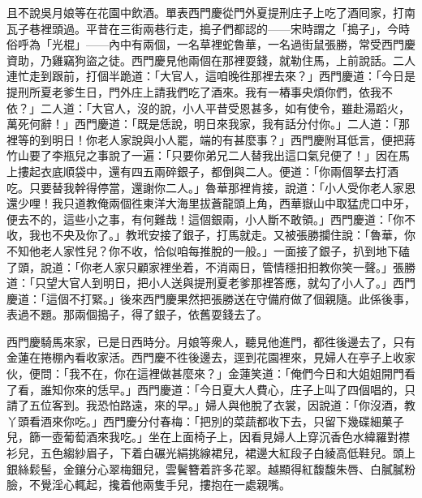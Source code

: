 且不說吳月娘等在花園中飲酒。單表西門慶從門外夏提刑庄子上吃了酒囘家，打南瓦子巷裡頭過。平昔在三街兩巷行走，搗子們都認的——宋時謂之「搗子」，今時俗呼為「光棍」——內中有兩個，一名草裡蛇魯華，一名過街鼠張勝，常受西門慶資助，乃雞竊狗盜之徒。西門慶見他兩個在那裡耍錢，就勒住馬，上前說話。二人連忙走到跟前，打個半跪道：「大官人，這咱晚徃那裡去來？」西門慶道：「今日是提刑所夏老爹生日，門外庄上請我們吃了酒來。我有一樁事央煩你們，依我不依？」二人道：「大官人，沒的說，小人平昔受恩甚多，如有使令，雖赴湯蹈火，萬死何辭！」西門慶道：「既是恁說，明日來我家，我有話分付你。」二人道：「那裡等的到明日！你老人家說與小人罷，端的有甚麼事？」西門慶附耳低言，便把蔣竹山要了李瓶兒之事說了一遍：「只要你弟兄二人替我出這口氣兒便了！」因在馬上摟起衣底順袋中，還有四五兩碎銀子，都倒與二人。便道：「你兩個拏去打酒吃。只要替我幹得停當，還謝你二人。」魯華那裡肯接，說道：「小人受你老人家恩還少哩！我只道教俺兩個徃東洋大海里拔蒼龍頭上角，西華嶽山中取猛虎口中牙，便去不的，這些小之事，有何難哉！這個銀兩，小人斷不敢領。」西門慶道：「你不收，我也不央及你了。」教玳安接了銀子，打馬就走。又被張勝攔住說：「魯華，你不知他老人家性兒？你不收，恰似咱每推脫的一般。」一面接了銀子，扒到地下磕了頭，說道：「你老人家只顧家裡坐着，不消兩日，管情穩抇抇教你笑一聲。」{}張勝道：「只望大官人到明日，把小人送與提刑夏老爹那裡答應，就勾了小人了。」西門慶道：「這個不打緊。」後來西門慶果然把張勝送在守備府做了個親隨。{}此係後事，表過不題。那兩個搗子，得了銀子，依舊耍錢去了。

西門慶騎馬來家，已是日西時分。月娘等衆人，聽見他進門，都徃後邊去了，只有金蓮在捲棚內看收家活。西門慶不徃後邊去，逕到花園裡來，見婦人在亭子上收家伙，便問：「我不在，你在這裡做甚麼來？」金蓮笑道：「俺們今日和大姐姐開門看了看，誰知你來的恁早。」西門慶道：「今日夏大人費心，庄子上叫了四個唱的，只請了五位客到。我恐怕路遠，來的早。」婦人與他脫了衣裳，因說道：「你沒酒，教丫頭看酒來你吃。」西門慶分付春梅：「把別的菜蔬都收下去，只留下幾碟細菓子兒，篩一壺葡萄酒來我吃。」坐在上面椅子上，因看見婦人上穿沉香色水緯羅對襟衫兒，五色縐紗眉子，下着白碾光絹挑線裙兒，裙邊大紅段子白綾高低鞋兒。頭上銀絲鬏髻，金鑲分心翠梅鈿兒，雲鬢簪着許多花翠。越顯得紅馥馥朱唇、白膩膩粉臉，{}不覺淫心輒起，攙着他兩隻手兒，摟抱在一處親嘴。

